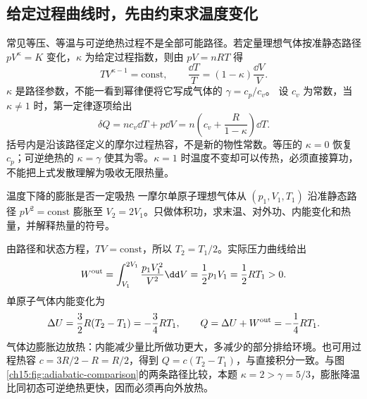 \subsection{给定过程曲线时，先由约束求温度变化}
常见等压、等温与可逆绝热过程不是全部可能路径。若定量理想气体按准静态路径 $pV^{\kappa}=K$ 变化，$\kappa$ 为给定过程指数，则由 $pV=nRT$ 得
\[
 TV^{\kappa-1}=\mathrm{const},\qquad
 \frac{\dd T}{T}=(1-\kappa)\frac{\dd V}{V}.
\]
$\kappa$ 是路径参数，不能一看到幂律便将它写成气体的 $\gamma=c_p/c_v$。
设 $c_v$ 为常数，当 $\kappa\ne1$ 时，第一定律逐项给出
\[
 \delta Q=nc_v\dd T+p\dd V
 =n\left(c_v+\frac{R}{1-\kappa}\right)\dd T.
\]
括号内是沿该路径定义的摩尔过程热容，不是新的物性常数。等压的 $\kappa=0$ 恢复 $c_p$；可逆绝热的 $\kappa=\gamma$ 使其为零。$\kappa=1$ 时温度不变却可以传热，必须直接算功，不能把上式发散理解为吸收无限热量。

\begin{origexamplebox}{温度下降的膨胀是否一定吸热}\label{ch15:ex:teaching-polytropic}
一摩尔单原子理想气体从 $(p_1,V_1,T_1)$ 沿准静态路径 $pV^2=\mathrm{const}$ 膨胀至 $V_2=2V_1$。只做体积功，求末温、对外功、内能变化和热量，并解释热量的符号。
\end{origexamplebox}
\begin{xesolution}
由路径和状态方程，$TV=\mathrm{const}$，所以 $T_2=T_1/2$。实际压力曲线给出
\[
 W^{\rm out}=\int_{V_1}^{2V_1}\frac{p_1V_1^2}{V^2}\dd V
 =\frac12p_1V_1=\frac12RT_1>0.
\]
单原子气体内能变化为
\[
 \Delta U=\frac32R(T_2-T_1)=-\frac34RT_1,
 \qquad Q=\Delta U+W^{\rm out}=-\frac14RT_1.
\]
气体边膨胀边放热：内能减少量比所做功更大，多减少的部分排给环境。也可用过程热容 $c=3R/2-R=R/2$，得到 $Q=c(T_2-T_1)$，与直接积分一致。与图\ref{ch15:fig:adiabatic-comparison}的两条路径比较，本题 $\kappa=2>\gamma=5/3$，膨胀降温比同初态可逆绝热更快，因而必须再向外放热。
\end{xesolution}
